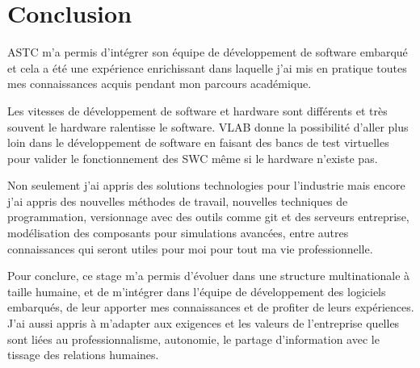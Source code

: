 \section{Conclusion}
ASTC m’a permis d’intégrer son équipe de développement de software embarqué et cela a été une expérience enrichissant dans laquelle j’ai mis en pratique toutes mes connaissances acquis pendant mon parcours académique.

Les vitesses de développement de software et hardware sont différents et très souvent le hardware ralentisse le software. VLAB donne la possibilité d’aller plus loin dans le développement de software en faisant des bancs de test virtuelles pour valider le fonctionnement des SWC même si le hardware n’existe pas. 

Non seulement j’ai appris des solutions technologies pour l’industrie mais encore j’ai appris des nouvelles méthodes de travail, nouvelles techniques de programmation, versionnage avec des outils comme git et des serveurs entreprise, modélisation des composants pour simulations avancées, entre autres connaissances qui seront utiles pour moi pour tout ma vie professionnelle. 


Pour conclure, ce stage m’a permis d’évoluer dans une structure multinationale à taille humaine, et de m’intégrer dans l’équipe de développement des logiciels embarqués, de leur apporter mes connaissances et de profiter de leurs expériences. J’ai aussi appris à m’adapter aux exigences et les valeurs de l’entreprise quelles sont liées au professionnalisme, autonomie, le partage d’information avec le tissage des relations humaines. 